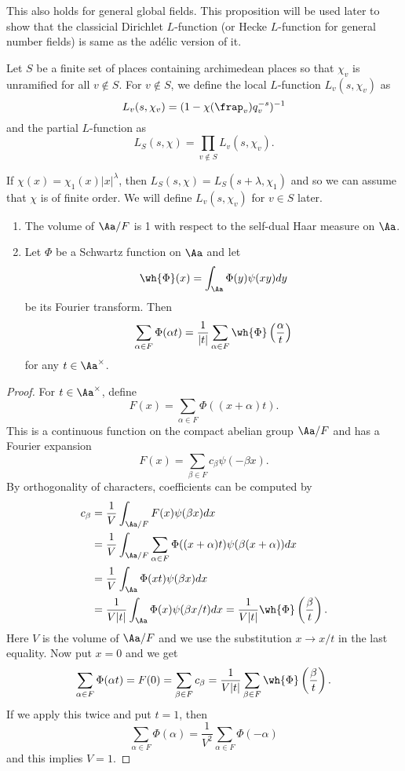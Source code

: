 This also holds for general global fields. 
This proposition will be used later to show that the classicial Dirichlet $L$-function (or Hecke $L$-function for general number fields) is same as the ad\'elic version of it. 

\begin{definition}
Let $S$ be a finite set of places containing archimedean places so that $\chi_{v}$ is unramified for all $v\not\in S$. For $v\not\in S$, we define the local $L$-function $L_{v}(s, \chi_{v})$ as 
$$
L_{v}(s, \chi_v) = (1-\chi(\frap_{v})q_{v}^{-s})^{-1}
$$
and the partial $L$-function as
$$
L_{S}(s, \chi) = \prod_{v\not\in S} L_{v}(s, \chi_{v}). 
$$
\end{definition}
If $\chi(x) = \chi_{1}(x)|x|^{\lambda}$, then $L_{S}(s, \chi) = L_{S}(s + \lambda, \chi_{1})$ and so we can assume that $\chi$ is of finite order. We will define $L_{v}(s, \chi_{v})$ for $v\in S$ later. 


\begin{proposition}
\begin{enumerate}
\item The volume of $\Aa/F$ is 1 with respect to the self-dual Haar measure on $\Aa$. 
\item Let $\Phi$ be a Schwartz function on $\Aa$ and let 
$$
\wh{\Phi}(x) = \int_{\Aa} \Phi(y) \psi(xy)dy
$$
be its Fourier transform. Then 
$$
\sum_{\alpha\in F} \Phi(\alpha t) = \frac{1}{|t|} \sum_{\alpha\in F} \wh{\Phi}\left(\frac{\alpha}{t}\right)
$$
for any $t\in \Aa^{\times}$. 
\end{enumerate}
\end{proposition}
\begin{proof}
For $t\in \Aa^{\times}$, define 
$$
F(x) = \sum_{\alpha\in F} \Phi((x+\alpha) t). 
$$
This is a continuous function on the compact abelian group $\Aa/F$ and has a Fourier expansion
$$
F(x) = \sum_{\beta\in F} c_{\beta} \psi(-\beta x).
$$
By orthogonality of characters, coefficients can be computed by 
\begin{align*}
c_{\beta} &= \frac{1}{V} \int_{\Aa/F} F(x) \psi(\beta x)dx \\
&= \frac{1}{V} \int_{\Aa/F} \sum_{\alpha\in F} \Phi((x+\alpha)t) \psi(\beta(x+\alpha)) dx \\
&= \frac{1}{V} \int_{\Aa} \Phi(xt)\psi(\beta x)dx \\
&=\frac{1}{V|t|} \int_{\Aa} \Phi(x)\psi(\beta x/t) dx = \frac{1}{V|t|} \wh{\Phi}\left(\frac{\beta}{t}\right).
\end{align*}
Here $V$ is the volume of $\Aa/F$ and we use the substitution $x \to x/t$ in the last equality. 
Now put $x =0$ and we get 
$$
\sum_{\alpha\in F} \Phi(\alpha t) = F(0) = \sum_{\beta\in F} c_{\beta}= \frac{1}{V|t|} \sum_{\beta\in F}\wh{\Phi}\left(\frac{\beta}{t}\right).
$$
If we apply this twice and put $t = 1$, then 
$$
\sum_{\alpha\in F} \Phi(\alpha) = \frac{1}{V^{2}} \sum_{\alpha\in F}\Phi(-\alpha)
$$
and this implies $V = 1$. 
\end{proof}




